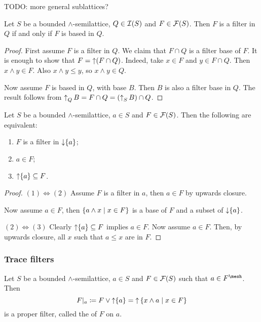 TODO: more general sublattices?

\begin{proposition}
Let $S$ be a bounded $\wedge$-semilattice, $Q\in\operatorname{\mathcal{I}}(S)$ and $F\in\operatorname{\mathcal{F}}(S)$. Then $F$ is a filter in $Q$ \textup{if and only if} $F$ is based in $Q$.
\end{proposition}
\begin{proof}
First assume $F$ is a filter in $Q$. We claim that $F\cap Q$ is a filter base of $F$. It is enough to show that $F = \operatorname{\uparrow}(F\cap Q)$. Indeed, take $x\in F$ and $y\in F\cap Q$. Then $x\wedge y \in F$. Also $x\wedge y \leq y$, so $x\wedge y\in Q$.

Now assume $F$ is based in $Q$, with base $B$. Then $B$ is also a filter base in $Q$. The result follows from $\operatorname{\uparrow}_Q B = F\cap Q = (\operatorname{\uparrow}_S B)\cap Q$. 
\end{proof}

\begin{lemma} \label{filterInPrincipalIdeal}
Let $S$ be a bounded $\wedge$-semilattice, $a\in S$ and $F\in\operatorname{\mathcal{F}}(S)$. Then the following are equivalent:
\begin{enumerate}
\item $F$ is a filter in $\operatorname{\downarrow}\{a\}$;
\item $a\in F$;
\item $\operatorname{\uparrow}\{a\} \subseteq F$.
\end{enumerate}
\end{lemma}
\begin{proof}
$(1) \Leftrightarrow (2)$ Assume $F$ is a filter in $a$, then $a\in F$ by upwards closure.

Now assume $a\in F$, then $\left\{ a\wedge x \;\middle|\; x\in F \right\}$ is a base of $F$ and a subset of $\operatorname{\downarrow}\{a\}$.

$(2) \Leftrightarrow (3)$ Clearly $\operatorname{\uparrow}\{a\} \subseteq F$ implies $a\in F$. Now assume $a\in F$. Then, by upwards closure, all $x$ such that $a\leq x$ are in $F$.
\end{proof}

\subsubsection{Trace filters}
\begin{definition}
Let $S$ be a bounded $\wedge$-semilattice, $a\in S$ and $F\in\operatorname{\mathcal{F}}(S)$ such that $a\in F^\mesh$.
Then
\[ F|_a \coloneqq F\vee \operatorname{\uparrow}\{a\} = \operatorname{\uparrow}\left\{ x\wedge a \;\middle|\; x\in F \right\} \]
is a proper filter, called the  of $F$ on $a$.
\end{definition}

